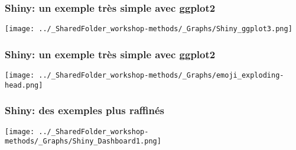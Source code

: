 \documentclass{beamer}
\begin{document}

    \begin{frame}
    
      \frametitle{Shiny: un exemple très simple avec ggplot2} \vspace{1cm}
      
        \begin{center}
      	  \texttt{[image: ../\_SharedFolder\_workshop-methods/\_Graphs/Shiny\_ggplot3.png]}
        \end{center} 
      
          
    \end{frame} 
    

    \begin{frame}
    
      \frametitle{Shiny: un exemple très simple avec ggplot2} \vspace{1cm}
      
        \begin{center}
      	  \texttt{[image: ../\_SharedFolder\_workshop-methods/\_Graphs/emoji\_exploding-head.png]}
        \end{center} 
      
          
    \end{frame}     
    
    

    \begin{frame}
    
      \frametitle{Shiny: des exemples plus raffinés} \vspace{1cm}
      
        \begin{center}
      	  \texttt{[image: ../\_SharedFolder\_workshop-methods/\_Graphs/Shiny\_Dashboard1.png]}
        \end{center} 
      
          
    \end{frame}  
    

    
\end{document}
